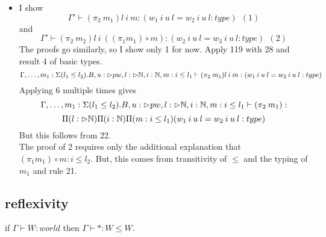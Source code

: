 \documentclass{article}
\begin{document}
\begin{itemize}
\begin{itemize}
\item I show  \[\Gamma' \vdash (\pi_2 \: m_1) l \: i \: m : (w_1 \: i \: u \: l = w_2 \: i \: u \: l : type) \:\: (1)\]
    and
    \[\Gamma' \vdash (\pi_2 \: m_2) l \: i \: ((\pi_1 m_1) \circ m): (w_2 \: i \: u \: l = w_3 \: i \: u \: l : type) \:\: (2)\]
    The proofs go similarly, so I show only 1 for now.
    Apply 119 with 28 and result 4 of basic types.
     \[\Gamma, \dots, m_1: \Sigma(l_1 \leq l_2).B, u: \rhd pw, l : \rhd \mathbb{N}, i: \mathbb{N}, m: i \leq l_1 \vdash (\pi_2 \: m_1) l \: i \: m : (w_1 \: i \: u \: l = w_2 \: i \: u \: l : type) \]
     Applying 6 multiple times gives 
       \[\Gamma, \dots, m_1: \Sigma(l_1 \leq l_2).B, u: \rhd pw, l : \rhd \mathbb{N}, i: \mathbb{N}, m: i \leq l_1 \vdash (\pi_2 \: m_1):\]
       \[\Pi(l: \rhd \mathbb{N})\Pi(i: \mathbb{N})\Pi(m: i \leq l_1)(w_1 \: i \: u \: l = w_2 \: i \: u \: l : type) \]
       But this follows from 22.\\
       The proof of 2 requires only the additional explanation that $(\pi_1 m_1) \circ m: i \leq l_2$. But, this comes from transitivity of $\leq$ and the typing of $m_1$ and rule 21.
    \end{itemize}
\end{itemize}

\subsection{reflexivity}
if $\Gamma \vdash W : world$ then $\Gamma \vdash * : W \leq W$.
\end{document}
